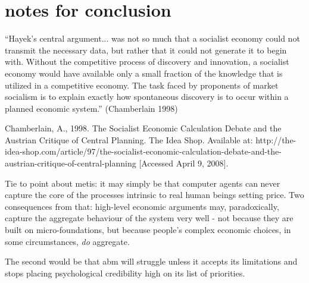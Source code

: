 \section{notes for conclusion}

``Hayek's central argument... was not so much that a socialist economy could not transmit the necessary data, but rather that it could not generate it to begin with. Without the competitive process of discovery and innovation, a socialist economy would have available only a small fraction of the knowledge that is utilized in a competitive economy. The task faced by proponents of market socialism is to explain exactly how spontaneous discovery is to occur within a planned economic system.'' (Chamberlain 1998)

Chamberlain, A., 1998. The Socialist Economic Calculation Debate and the Austrian Critique of Central Planning. The Idea Shop. Available at: http://the-idea-shop.com/article/97/the-socialist-economic-calculation-debate-and-the-austrian-critique-of-central-planning [Accessed April 9, 2008].

Tie to point about metis: it may simply be that computer agents can never capture the core of the processes intrinsic to real human beings setting price. Two consequences from that: high-level economic arguments may, paradoxically, capture the aggregate behaviour of the system very well - not because they are built on micro-foundations, but because people's complex economic choices, in some circumstances, \emph{do} aggregate.

The second would be that \gls{abm} will struggle unless it accepts its limitations and stops placing psychological credibility high on its list of priorities.